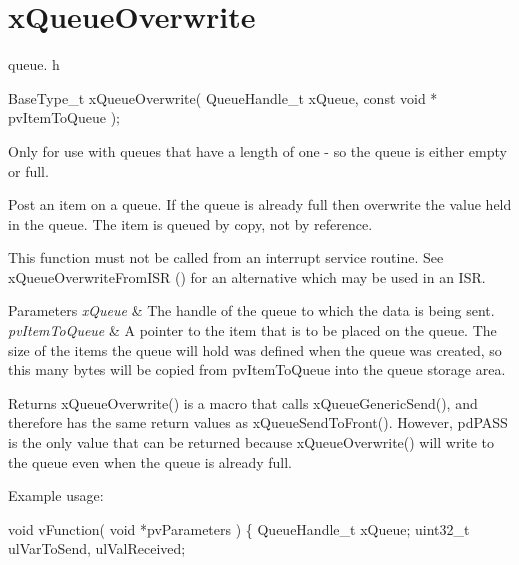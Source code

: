 \hypertarget{group__x_queue_overwrite}{}\section{x\+Queue\+Overwrite}
\label{group__x_queue_overwrite}
queue. h 
\begin{DoxyPre}
 BaseType\_t xQueueOverwrite(
                              QueueHandle\_t xQueue,
                              const void * pvItemToQueue
                         );
   \end{DoxyPre}


Only for use with queues that have a length of one -\/ so the queue is either empty or full.

Post an item on a queue. If the queue is already full then overwrite the value held in the queue. The item is queued by copy, not by reference.

This function must not be called from an interrupt service routine. See x\+Queue\+Overwrite\+From\+I\+SR () for an alternative which may be used in an I\+SR.


\begin{DoxyParams}{Parameters}
{\em x\+Queue} & The handle of the queue to which the data is being sent.\\
\hline
{\em pv\+Item\+To\+Queue} & A pointer to the item that is to be placed on the queue. The size of the items the queue will hold was defined when the queue was created, so this many bytes will be copied from pv\+Item\+To\+Queue into the queue storage area.\\
\hline
\end{DoxyParams}
\begin{DoxyReturn}{Returns}
x\+Queue\+Overwrite() is a macro that calls x\+Queue\+Generic\+Send(), and therefore has the same return values as x\+Queue\+Send\+To\+Front(). However, pd\+P\+A\+SS is the only value that can be returned because x\+Queue\+Overwrite() will write to the queue even when the queue is already full.
\end{DoxyReturn}
Example usage\+: 
\begin{DoxyPre}\end{DoxyPre}



\begin{DoxyPre} void vFunction( void *pvParameters )
 \{
 QueueHandle\_t xQueue;
 uint32\_t ulVarToSend, ulValReceived;\end{DoxyPre}



